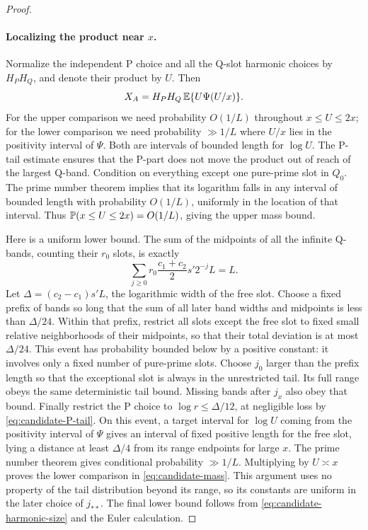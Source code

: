 \begin{proof}
\paragraph{Localizing the product near $x$.}
Normalize the independent P choice and all the Q-slot harmonic
choices by $H_PH_Q$, and denote their product by $U$. Then
\[
 X_A=H_PH_Q\,\mathbb E\{U\Psi(U/x)\}.
\]
For the upper comparison we need probability $O(1/L)$ throughout
$x\le U\le2x$; for the lower comparison we need probability
$\gg1/L$ where $U/x$ lies in the positivity interval of $\Psi$.
Both are intervals of bounded length for $\log U$. The P-tail
estimate ensures that the P-part does not move the product out of
reach of the largest Q-band.
Condition on everything except one pure-prime slot in $Q_0$.
The prime number theorem implies that its logarithm falls in any
interval of bounded length with probability $O(1/L)$, uniformly in
the location of that interval. Thus
$\mathbb P(x\le U\le2x)=O(1/L)$, giving the upper mass bound.

Here is a uniform lower bound. The sum of the midpoints of all the
infinite Q-bands, counting their $r_0$ slots, is exactly
\[
 \sum_{j\ge0}r_0\frac{c_1+c_2}{2}s'2^{-j}L=L.
\]
Let $\Delta=(c_2-c_1)s'L$, the logarithmic width of the free slot.
Choose a fixed prefix of bands so long that the sum of all later
band widths and midpoints is less than $\Delta/24$. Within that
prefix, restrict all slots except the free slot to fixed small
relative neighborhoods of their midpoints, so that their total
deviation is at most $\Delta/24$. This event has probability bounded
below by a positive constant: it involves only a fixed number of
pure-prime slots. Choose $j_0$ larger than the prefix length so that
the exceptional slot is always in the unrestricted tail. Its full
range obeys the same deterministic tail bound. Missing bands after
$j_x$ also obey that bound. Finally restrict the P choice to
$\log r\le\Delta/12$, at negligible loss by
\eqref{eq:candidate-P-tail}.
On this event, a target interval for $\log U$ coming from the
positivity interval of $\Psi$ gives an interval of fixed positive
length for the free slot, lying a distance at least $\Delta/4$
from its range endpoints for large $x$. The prime number theorem
gives conditional probability $\gg1/L$. Multiplying by $U\asymp x$
proves the lower comparison in \eqref{eq:candidate-mass}. This
argument uses no property of the tail distribution beyond its
range, so its constants are uniform in the later choice of
$j_{**}$. The final lower bound follows from
\eqref{eq:candidate-harmonic-size} and the Euler calculation.
\end{proof}

